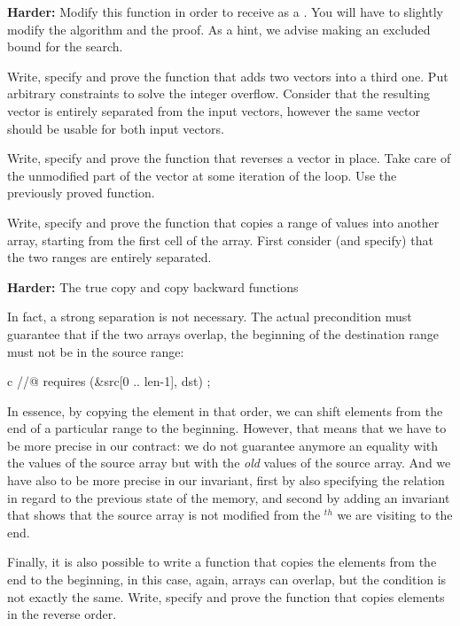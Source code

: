 \textbf{Harder:} Modify this function in order to receive 
as a . You will have to slightly modify the algorithm
and the proof. As a hint, we advise making  an excluded
bound for the search.




Write, specify and prove the function that adds two vectors into a third
one. Put arbitrary constraints to solve the integer overflow. Consider that
the resulting vector is entirely separated from the input vectors, however
the same vector should be usable for both input vectors.






Write, specify and prove the function that reverses a vector in place. Take
care of the unmodified part of the vector at some iteration of the loop.
Use the previously proved  function.






Write, specify and prove the function  that copies a range
of values into another array, starting from the first cell of the array.
First consider (and specify) that the two ranges are entirely separated.




\textbf{Harder:} The true copy and copy backward functions


In fact, a strong separation is not necessary. The actual precondition must
guarantee that if the two arrays overlap, the beginning of the destination
range must not be in the source range:


\begin{CodeBlock}{c}
//@ requires \separated(&src[0 .. len-1], dst) ;
\end{CodeBlock}


In essence, by copying the element in that order, we can shift elements from
the end of a particular range to the beginning. However, that means that we
have to be more precise in our contract: we do not guarantee anymore an equality
with the values of the source array but with the \emph{old} values of the
source array. And we have also to be more precise in our invariant, first by
also specifying the relation in regard to the previous state of the memory, and
second by adding an invariant that shows that the source array is not modified
from the $^{th}$ we are visiting to the end.


Finally, it is also possible to write a function that copies the elements from
the end to the beginning, in this case, again, arrays can overlap, but the
condition is not exactly the same. Write, specify and prove the function
 that copies elements in the reverse order.

